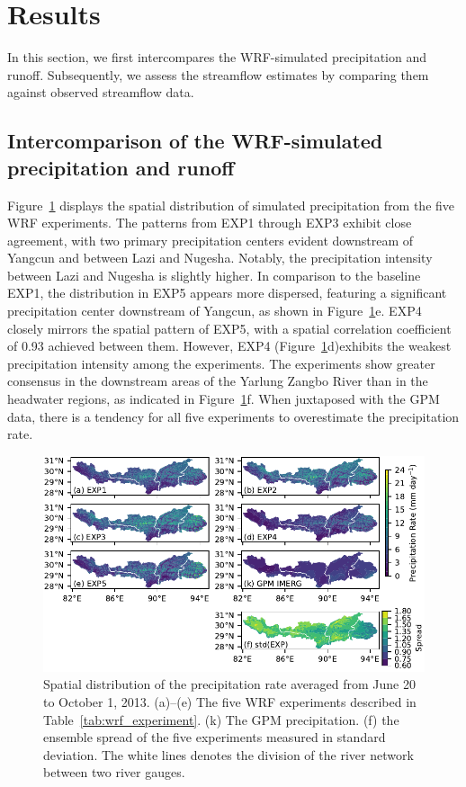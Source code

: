 \documentclass[draft]{agujournal2019}
\begin{document}
\section{Results}
\label{sec:results}

In this section, we first intercompares the WRF-simulated precipitation and runoff. Subsequently, we assess the streamflow estimates by comparing them against observed streamflow data.

\subsection{Intercomparison of the WRF-simulated precipitation and runoff}

Figure~\ref{fig:prdist} displays the spatial distribution of simulated precipitation from the five WRF experiments. The patterns from EXP1 through EXP3 exhibit close agreement, with two primary precipitation centers evident downstream of Yangcun and between Lazi and Nugesha. Notably, the precipitation intensity between Lazi and Nugesha is slightly higher. In comparison to the baseline EXP1, the distribution in EXP5 appears more dispersed, featuring a significant precipitation center downstream of Yangcun, as shown in Figure~\ref{fig:prdist}e. EXP4 closely mirrors the spatial pattern of EXP5, with a spatial correlation coefficient of 0.93 achieved between them. However, EXP4 (Figure~\ref{fig:prdist}d)exhibits the weakest precipitation intensity among the experiments. The experiments show greater consensus in the downstream areas of the Yarlung Zangbo River than in the headwater regions, as indicated in Figure~\ref{fig:prdist}f. When juxtaposed with the GPM data, there is a tendency for all five experiments to overestimate the precipitation rate.

\begin{figure}[h!]
  \centering
  \noindent\includegraphics[width=140mm]{prrn_prdist.pdf}
  \caption{Spatial distribution of the precipitation rate averaged from June 20 to October 1, 2013. (a)--(e) The five WRF experiments described in Table~\ref{tab:wrf_experiment}. (k) The GPM precipitation. (f) the ensemble spread of the five experiments measured in standard deviation. The white lines denotes the division of the river network between two river gauges. \label{fig:prdist}}
\end{figure}
\end{document}
